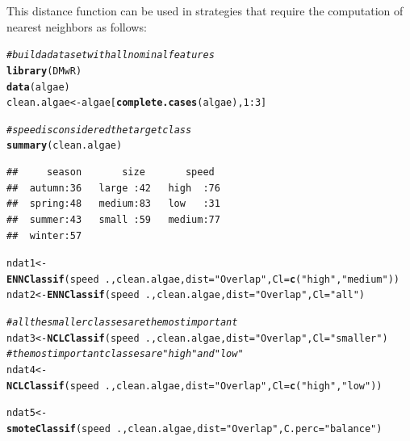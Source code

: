 \documentclass[10pt,a4paper]{article}\usepackage[]{graphicx}\usepackage[]{color}
\makeatletter
\newcommand{\hlnum}[1]{\textcolor[rgb]{0.686,0.059,0.569}{#1}}%
\newcommand{\hlstr}[1]{\textcolor[rgb]{0.192,0.494,0.8}{#1}}%
\newcommand{\hlcom}[1]{\textcolor[rgb]{0.678,0.584,0.686}{\textit{#1}}}%
\newcommand{\hlopt}[1]{\textcolor[rgb]{0,0,0}{#1}}%
\newcommand{\hlstd}[1]{\textcolor[rgb]{0.345,0.345,0.345}{#1}}%
\newcommand{\hlkwb}[1]{\textcolor[rgb]{0.69,0.353,0.396}{#1}}%
\newcommand{\hlkwc}[1]{\textcolor[rgb]{0.333,0.667,0.333}{#1}}%
\newcommand{\hlkwd}[1]{\textcolor[rgb]{0.737,0.353,0.396}{\textbf{#1}}}%
\newenvironment{kframe}{%
 \def\at@end@of@kframe{}%
 \ifinner\ifhmode%
  \def\at@end@of@kframe{\end{minipage}}%
  \begin{minipage}{\columnwidth}%
 \fi\fi%
 \def\FrameCommand##1{\hskip\@totalleftmargin \hskip-\fboxsep
 \colorbox{shadecolor}{##1}\hskip-\fboxsep
     \hskip-\linewidth \hskip-\@totalleftmargin \hskip\columnwidth}%
 \MakeFramed {\advance\hsize-\width
   \@totalleftmargin\z@ \linewidth\hsize
   \@setminipage}}%
 {\par\unskip\endMakeFramed%
 \at@end@of@kframe}
\newenvironment{knitrout}{}{} %
\makeatother
\begin{document}
This distance function can be used in strategies that require the computation of nearest neighbors as follows:

\begin{knitrout}\footnotesize
{}\color{fgcolor}\begin{kframe}
\begin{alltt}
\hlcom{# build a data set with all nominal features}
\hlkwd{library}\hlstd{(DMwR)}
\hlkwd{data}\hlstd{(algae)}
\hlstd{clean.algae} \hlkwb{<-} \hlstd{algae[}\hlkwd{complete.cases}\hlstd{(algae),}\hlnum{1}\hlopt{:}\hlnum{3}\hlstd{]}

\hlcom{# speed is considered the target class}
\hlkwd{summary}\hlstd{(clean.algae)}
\end{alltt}
\begin{verbatim}
##     season       size       speed   
##  autumn:36   large :42   high  :76  
##  spring:48   medium:83   low   :31  
##  summer:43   small :59   medium:77  
##  winter:57
\end{verbatim}
\begin{alltt}
\hlstd{ndat1} \hlkwb{<-} \hlkwd{ENNClassif}\hlstd{(speed}\hlopt{~}\hlstd{., clean.algae,} \hlkwc{dist}\hlstd{=}\hlstr{"Overlap"}\hlstd{,}  \hlkwc{Cl}\hlstd{=}\hlkwd{c}\hlstd{(}\hlstr{"high"}\hlstd{,} \hlstr{"medium"}\hlstd{))}
\hlstd{ndat2} \hlkwb{<-} \hlkwd{ENNClassif}\hlstd{(speed}\hlopt{~}\hlstd{., clean.algae,} \hlkwc{dist}\hlstd{=}\hlstr{"Overlap"}\hlstd{,}  \hlkwc{Cl}\hlstd{=}\hlstr{"all"}\hlstd{)}

\hlcom{#all the smaller classes are the most important}
\hlstd{ndat3} \hlkwb{<-} \hlkwd{NCLClassif}\hlstd{(speed}\hlopt{~}\hlstd{., clean.algae,} \hlkwc{dist}\hlstd{=}\hlstr{"Overlap"}\hlstd{,}  \hlkwc{Cl}\hlstd{=}\hlstr{"smaller"}\hlstd{)}
\hlcom{# the most important classes are "high" and "low"}
\hlstd{ndat4} \hlkwb{<-} \hlkwd{NCLClassif}\hlstd{(speed}\hlopt{~}\hlstd{., clean.algae,} \hlkwc{dist}\hlstd{=}\hlstr{"Overlap"}\hlstd{,}  \hlkwc{Cl}\hlstd{=}\hlkwd{c}\hlstd{(}\hlstr{"high"}\hlstd{,} \hlstr{"low"}\hlstd{))}

\hlstd{ndat5} \hlkwb{<-} \hlkwd{smoteClassif}\hlstd{(speed}\hlopt{~}\hlstd{., clean.algae,} \hlkwc{dist}\hlstd{=}\hlstr{"Overlap"}\hlstd{,} \hlkwc{C.perc}\hlstd{=}\hlstr{"balance"}\hlstd{)}
\end{alltt}
\end{kframe}
\end{knitrout}
\end{document}

